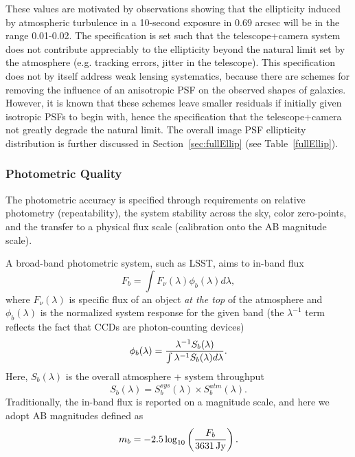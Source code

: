 These values are motivated by observations showing that the
ellipticity induced by atmospheric turbulence in a 10-second exposure
in 0.69 arcsec will be in the range 0.01-0.02.  The specification is
set such that the telescope+camera system does not contribute
appreciably to the
ellipticity beyond the natural limit set by the atmosphere (e.g. tracking
errors, jitter in the telescope).  This
specification does not by itself address weak lensing systematics,
because there are schemes for removing the influence of an anisotropic
PSF on the observed shapes of galaxies.  However, it is known that
these schemes leave smaller residuals if initially given isotropic
PSFs to begin with, hence the specification that the telescope+camera
not greatly degrade the natural limit. The overall image PSF ellipticity distribution
is further discussed in Section~\ref{sec:fullEllip} (see Table~\ref{fullEllip}).




\subsubsection{Photometric Quality}
\label{photoacc}
The photometric accuracy is
specified through requirements on relative photometry (repeatability), the
system stability across the sky, color zero-points, and the transfer to a
physical flux scale (\ie calibration onto the AB magnitude scale).

A broad-band photometric system, such as LSST, aims to 
 in-band flux
\begin{equation}
\label{Fb}
             F_b = \int{F_\nu(\lambda) \phi_b(\lambda) d\lambda},
\end{equation}
where $F_\nu(\lambda)$ is specific flux of an object {\it at the top} of
the atmosphere and $\phi_b(\lambda)$ is the normalized system response
for the given band (the $\lambda^{-1}$  term reflects the fact that CCDs
are photon-counting devices)
\begin{equation}
\label{PhiDef}
\phi_b(\lambda) = {\lambda^{-1} S_b(\lambda) \over \int{\lambda^{-1} S_b(\lambda) d\lambda}}.
\end{equation}
Here, $S_b(\lambda)$ is the overall atmosphere + system throughput
\begin{equation}
\label{SDef}
         S_b(\lambda) = S_b^{sys}(\lambda) \times S_b^{atm}(\lambda).
\end{equation}
Traditionally, the in-band flux is reported on a magnitude scale,
and here we adopt AB magnitudes defined as
\begin{equation}
\label{ABmag}
             m_b = -2.5\log_{10}\left({F_b \over 3631 \, {\rm Jy}}\right).
\end{equation}

